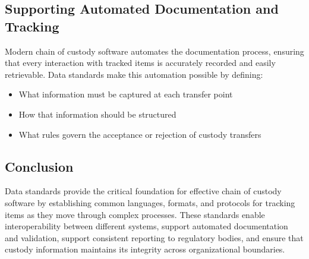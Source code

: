 \documentclass[title=small,preset=opensansnote,par=skip]{article}
\begin{document}
\subsection{Supporting Automated Documentation and Tracking}
\label{sec:org00777b9}

Modern chain of custody software automates the documentation process, ensuring that every interaction with tracked items is accurately recorded and easily retrievable. Data standards make this automation possible by defining:

\begin{itemize}
\item What information must be captured at each transfer point
\item How that information should be structured
\item What rules govern the acceptance or rejection of custody transfers
\end{itemize}
\subsection{Conclusion}
\label{sec:org7882cfe}
Data standards provide the critical foundation for effective chain of custody software by establishing common languages, formats, and protocols for tracking items as they move through complex processes. These standards enable interoperability between different systems, support automated documentation and validation, support consistent reporting to regulatory bodies, and ensure that custody information maintains its integrity across organizational boundaries.
\end{document}
